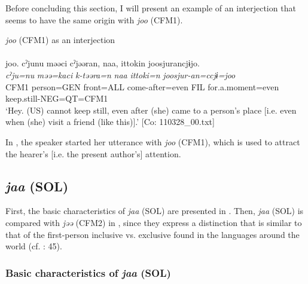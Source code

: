   Before concluding this section, I will present an example of an interjection that seems to have the same origin with \textit{joo} (CFM1).

\ea\label{ex:10.89}   \textit{joo} (CFM1) as an interjection\\\\
      \glll    joo.  cˀjunu  məəci  cˀjəəran,  naa,  {\textbar}ittoki{\textbar}n  joosjurancjɨjo.\\
    \textit{}  \textit{cˀju=nu}  \textit{məə=kaci}  \textit{k-təəra=n}  \textit{naa}  \textit{ittoki=n}   \textit{joosjur-an=ccjɨ=joo}\\
    CFM1  person=GEN  front=ALL  come-after=even  FIL  for.a.moment=even  keep.still-NEG=QT=CFM1\\
\glt     ‘Hey. (US) cannot keep still, even after (she) came to a person’s place [i.e. even when (she) visit a friend (like this)].’  [Co: 110328\_00.txt]
\z

In , the speaker started her utterance with \textit{joo} (CFM1), which is used to attract the hearer’s [i.e. the present author’s] attention.

\subsection{\textit{jaa} (SOL)}\label{sec:10.5.2}

First, the basic characteristics of \textit{jaa} (SOL) are presented in . Then, \textit{jaa} (SOL) is compared with \textit{jəə} (CFM2) in , since they express a distinction that is similar to that of the first-person inclusive vs. exclusive found in the languages around the world (cf. \citealt{Payne1997}: 45).

\subsubsection{Basic characteristics of \textit{jaa} (SOL)}\label{sec:10.5.2.1}

